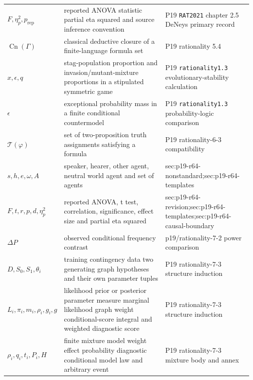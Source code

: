 \begin{longtable}{@{}p{}p{}p{}@{}}
\(F,\allowbreak \eta_p^2,\allowbreak p_{\mathrm{rep}}\) & reported ANOVA statistic partial eta squared and source inference convention & P19 \texttt{RAT2021} chapter 2.\allowbreak{}5 DeNeys primary record \\
\(\operatorname{Cn}(\Gamma)\) & classical deductive closure of a finite-language formula set & P19 rationality 5.\allowbreak{}4 \\
\(x,\allowbreak \epsilon,\allowbreak q\) & stag-population proportion and invasion/mutant-mixture proportions in a stipulated symmetric game & P19 \texttt{rationality1.\allowbreak{}3} evolutionary-\allowbreak{}stability calculation \\
\(\epsilon\) & exceptional probability mass in a finite conditional countermodel & P19 \texttt{rationality1.\allowbreak{}3} probability-\allowbreak{}logic comparison \\
\(\mathcal T(\varphi)\) & set of two-proposition truth assignments satisfying a formula & P19 rationality-\allowbreak{}6-\allowbreak{}3 compatibility \\
\(s,\allowbreak h,\allowbreak e,\allowbreak \omega,\allowbreak A\) & speaker, hearer, other agent, neutral world agent and set of agents & sec:\allowbreak{}p19-\allowbreak{}r64-\allowbreak{}nonstandard;sec:\allowbreak{}p19-\allowbreak{}r64-\allowbreak{}templates \\
\(F,\allowbreak t,\allowbreak r,\allowbreak p,\allowbreak d,\allowbreak \eta_p^2\) & reported ANOVA, t test, correlation, significance, effect size and partial eta squared & sec:\allowbreak{}p19-\allowbreak{}r64-\allowbreak{}revision;sec:\allowbreak{}p19-\allowbreak{}r64-\allowbreak{}templates;sec:\allowbreak{}p19-\allowbreak{}r64-\allowbreak{}causal-\allowbreak{}boundary \\
\(\Delta P\) & observed conditional frequency contrast & p19/\allowbreak{}rationality-\allowbreak{}7-\allowbreak{}2 power comparison \\
\(D,\allowbreak S_0,\allowbreak S_1,\allowbreak \theta_i\) & training contingency data two generating graph hypotheses and their own parameter tuples & P19 rationality-\allowbreak{}7-\allowbreak{}3 structure induction \\
\(L_i,\allowbreak \pi_i,\allowbreak m_i,\allowbreak \rho_i,\allowbreak g_i,\allowbreak g\) & likelihood prior or posterior parameter measure marginal likelihood graph weight conditional-score integral and weighted diagnostic score & P19 rationality-\allowbreak{}7-\allowbreak{}3 structure induction \\
\(\rho_i,\allowbreak q_i,\allowbreak t_i,\allowbreak P_i,\allowbreak H\) & finite mixture model weight effect probability diagnostic conditional model law and arbitrary event & P19 rationality-\allowbreak{}7-\allowbreak{}3 mixture body and annex \\

\end{longtable}

